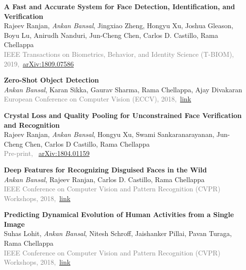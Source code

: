 \documentclass[11pt, a4paper]{article}
\begin{document}
\vspace{4pt}

\textbf{A Fast and Accurate System for Face Detection, Identification, and Verification} \\
Rajeev Ranjan, \textit{Ankan Bansal}, Jingxiao Zheng, Hongyu Xu, Joshua Gleason, Boyu Lu, Anirudh
Nanduri, Jun-Cheng Chen, Carlos D. Castillo, Rama Chellappa\\
\textcolor{gray}{IEEE Transactions on Biometrics, Behavior, and Identity Science (T-BIOM), 2019,}~\href{https://arxiv.org/abs/1809.07586}{arXiv:1809.07586}

\vspace{4pt}

\textbf{Zero-Shot Object Detection}\\
\textit{Ankan Bansal}, Karan Sikka, Gaurav Sharma, Rama Chellappa, Ajay Divakaran\\
\textcolor{gray}{European Conference on Computer Vision (ECCV), 2018,}~\href{http://openaccess.thecvf.com/content_ECCV_2018/html/Ankan_Bansal_Zero-Shot_Object_Detection_ECCV_2018_paper.html}{link}

\vspace{4pt}

\textbf{Crystal Loss and Quality Pooling for Unconstrained Face Verification and Recognition} \\
Rajeev Ranjan, \textit{Ankan Bansal}, Hongyu Xu, Swami Sankaranarayanan, Jun-Cheng Chen, Carlos D
Castillo, Rama Chellappa\\
\textcolor{gray}{Pre-print,} ~\href{https://arxiv.org/abs/1804.01159}{arXiv:1804.01159}

\vspace{4pt}

\textbf{Deep Features for Recognizing Disguised Faces in the Wild} \\
\textit{Ankan Bansal}, Rajeev Ranjan, Carlos D. Castillo, Rama Chellappa\\
\textcolor{gray}{IEEE Conference on Computer Vision and Pattern Recognition (CVPR) Workshops,
2018,}~\href{http://openaccess.thecvf.com/content_cvpr_2018_workshops/w1/html/Bansal_Deep_Features_for_CVPR_2018_paper.html}{link}

\vspace{4pt}

\textbf{Predicting Dynamical Evolution of Human Activities from a Single Image} \\
Suhas Lohit, \textit{Ankan Bansal}, Nitesh Schroff, Jaishanker Pillai, Pavan Turaga, Rama
Chellappa\\
\textcolor{gray}{IEEE Conference on Computer Vision and Pattern Recognition (CVPR) Workshops,
2018,}~\href{http://openaccess.thecvf.com/content_cvpr_2018_workshops/w10/html/Lohit_Predicting_Dynamical_Evolution_CVPR_2018_paper.html}{link}
\end{document}
